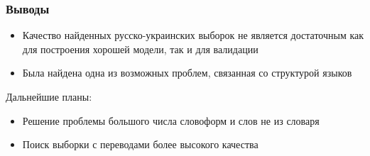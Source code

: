 \documentclass[10pt,pdf,hyperref={unicode}]{beamer}
\begin{document}
\begin{frame}
	
	\frametitle{Выводы}
	
	\begin{itemize}
		\item
			Качество найденных русско-украинских выборок не является достаточным как для построения хорошей модели, так и для валидации	
		\item
			Была найдена одна из возможных проблем, связанная со структурой языков
	\end{itemize}
	
	Дальнейшие планы:
	\begin{itemize}
		\item Решение проблемы большого числа словоформ и слов не из словаря
		
		\item Поиск выборки с переводами более высокого качества
	\end{itemize}
	
\end{frame}
\end{document}

